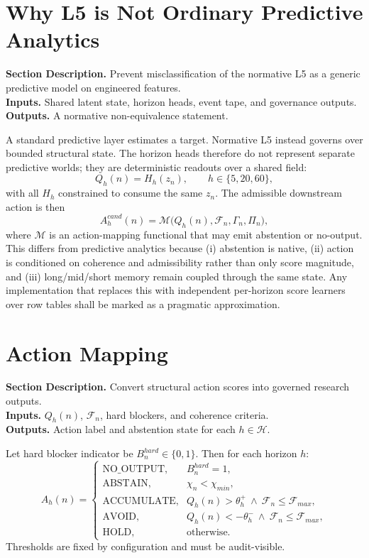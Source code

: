 \documentclass[11pt]{report}
\newcommand{\meta}[3]{\textbf{Section Description.} #1\\
\textbf{Inputs.} #2\\
\textbf{Outputs.} #3\par}
\begin{document}
\section{Why L5 is Not Ordinary Predictive Analytics}
\meta{Prevent misclassification of the normative L5 as a generic predictive model on engineered features.}{Shared latent state, horizon heads, event tape, and governance outputs.}{A normative non-equivalence statement.}

A standard predictive layer estimates a target. Normative L5 instead governs over bounded structural state. The horizon heads therefore do not represent separate predictive worlds; they are deterministic readouts over a shared field:
\[
Q_h(n)=H_h(z_n),\qquad h\in\{5,20,60\},
\]
with all $H_h$ constrained to consume the same $z_n$. The admissible downstream action is then
\[
A_h^{cand}(n)=\mathcal{M}\big(Q_h(n),\mathcal{F}_n,\Gamma_n,\Pi_n\big),
\]
where $\mathcal{M}$ is an action-mapping functional that may emit abstention or no-output. This differs from predictive analytics because (i) abstention is native, (ii) action is conditioned on coherence and admissibility rather than only score magnitude, and (iii) long/mid/short memory remain coupled through the same state. Any implementation that replaces this with independent per-horizon score learners over row tables shall be marked as a pragmatic approximation.

\section{Action Mapping}
\meta{Convert structural action scores into governed research outputs.}{$Q_h(n)$, $\mathcal{F}_n$, hard blockers, and coherence criteria.}{Action label and abstention state for each $h\in\mathcal{H}$.}

Let hard blocker indicator be $B_n^{hard}\in\{0,1\}$. Then for each horizon $h$:
\[
A_h(n)=\begin{cases}
\text{NO\_OUTPUT}, & B_n^{hard}=1,\\
\text{ABSTAIN}, & \chi_n<\chi_{min},\\
\text{ACCUMULATE}, & Q_h(n)>\theta_h^{+}\ \wedge\ \mathcal{F}_n\le\mathcal{F}_{max},\\
\text{AVOID}, & Q_h(n)<-\theta_h^{-}\ \wedge\ \mathcal{F}_n\le\mathcal{F}_{max},\\
\text{HOLD}, & \text{otherwise.}
\end{cases}
\]
Thresholds are fixed by configuration and must be audit-visible.
\end{document}

